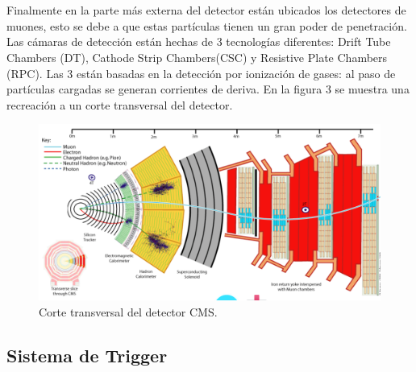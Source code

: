 \\
\\
Finalmente en la parte más externa del detector están ubicados los detectores de muones, esto se debe a que estas partículas tienen un gran poder de penetración. Las cámaras de detección están hechas de 3 tecnologías diferentes: Drift Tube Chambers (DT), Cathode Strip Chambers(CSC) y Resistive Plate Chambers (RPC). Las 3 están basadas en la detección por ionización de gases: al paso de partículas cargadas se generan corrientes de deriva. En la figura 3 se muestra una recreación a un corte transversal del detector.

\begin{figure}
\centering
\includegraphics[width=15cm]{F3.png}
\caption{\label{fig:frog} Corte transversal del detector CMS.}
\end{figure}

\subsection{Sistema de Trigger}

